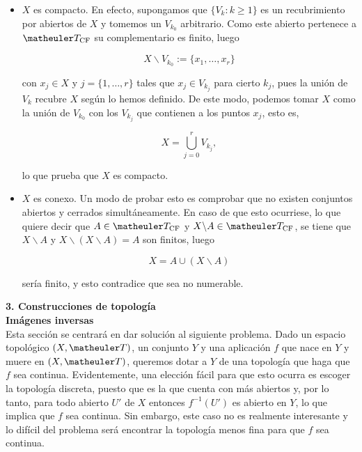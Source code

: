 \begin{itemize}
\item $X$ es compacto. En efecto, supongamos que $\{V_k : k \geq 1\}$ es un recubrimiento por abiertos de $X$ y tomemos un $V_{k_0}$ arbitrario. Como este abierto pertenece a $\T_{\text{CF}}$ su complementario es finito, luego 

\[X \backslash V_{k_0} := \{x_1, \ldots, x_r\}\]

con $x_j \in X$ y $j=\{1,\ldots, r\}$ tales que $x_j\in V_{k_j}$ para cierto $k_j$, pues la unión de $V_k$ recubre $X$ según lo hemos definido. De este modo, podemos tomar $X$ como la unión de $V_{k_0}$ con los $V_{k_j}$ que contienen a los puntos $x_j$, esto es,

\[X=\bigcup_{j=0}^r V_{k_j},\]

lo que prueba que $X$ es compacto. 

\item $X$ es conexo. Un modo de probar esto es comprobar que no existen conjuntos abiertos y cerrados simultáneamente. En caso de que esto ocurriese, lo que quiere decir que $A\in \T_{\text{CF}}$ y $X\backslash A \in \T_{\text{CF}}$, se tiene que $X \backslash A$ y $X\backslash (X\backslash A)=A$ son finitos, luego

\[X=A \cup (X\backslash A)\]

sería finito, y esto contradice que sea no numerable. 

\end{itemize}



















\textbf{3. Construcciones de topología} \\

\textbf{Imágenes inversas} \\

Esta sección se centrará en dar solución al siguiente problema. Dado un espacio topológico $(X,\T)$, un conjunto $Y$ y una aplicación $f$ que nace en $Y$ y muere en $(X,\T)$, queremos dotar a $Y$ de una topología que haga que $f$ sea continua. Evidentemente, una elección fácil para que esto ocurra es escoger la topología discreta, puesto que es la que cuenta con más abiertos y, por lo tanto, para todo abierto $U'$ de $X$ entonces $f^{-1}(U')$ es abierto en $Y$, lo que implica que $f$ sea continua. Sin embargo, este caso no es realmente interesante y lo difícil del problema será encontrar la topología menos fina para que $f$ sea continua. \\

